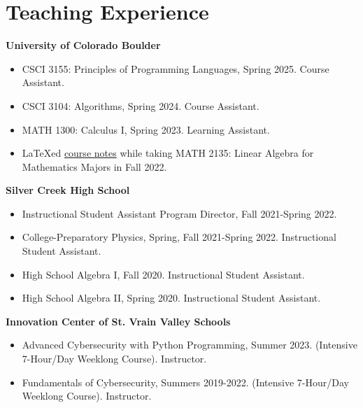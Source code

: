 \documentclass[a4paper,20pt]{article}
\begin{document}
    \section{Teaching Experience}
      \textbf{University of Colorado Boulder}
      \begin{itemize}
        \vspace{-5pt}
        \item CSCI 3155: Principles of Programming Languages, Spring 2025. Course Assistant.
        \vspace{-5pt}
        \item CSCI 3104: Algorithms, Spring 2024. Course Assistant.
        \vspace{-5pt}
        \item MATH 1300: Calculus I, Spring 2023. Learning Assistant.
        \vspace{-5pt}
        \item \LaTeX ed \href{https://officialadithya.github.io/assets/pdf/course_materials/linearalgebra.pdf}{course notes} while taking MATH 2135: Linear Algebra for Mathematics Majors in Fall 2022.
        \vspace{-5pt}
      \end{itemize}
      \textbf{Silver Creek High School}
      \begin{itemize}
          \vspace{-5pt}
          \item Instructional Student Assistant Program Director, Fall 2021-Spring 2022.
          \vspace{-5pt}
          \item College-Preparatory Physics, Spring, Fall 2021-Spring 2022. Instructional Student Assistant. 
          \vspace{-5pt}
          \item High School Algebra I, Fall 2020. Instructional Student Assistant. 
          \vspace{-5pt}
          \item High School Algebra II, Spring 2020. Instructional Student Assistant.
          \vspace{-5pt}
        \end{itemize}
        \textbf{Innovation Center of St. Vrain Valley Schools}
        \begin{itemize}
          \vspace{-5pt}
          \item Advanced Cybersecurity with Python Programming, Summer 2023. (Intensive 7-Hour/Day Weeklong Course). Instructor.
          \vspace{-5pt}
          \item Fundamentals of Cybersecurity, Summers 2019-2022. (Intensive 7-Hour/Day Weeklong Course). Instructor.
        \end{itemize}
      
\end{document}
